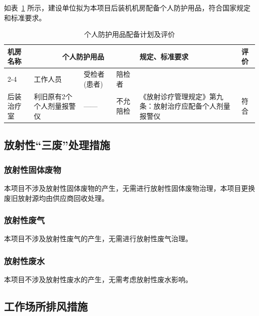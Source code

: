 如表~\ref{tab:ch4-ppe} 所示，建设单位拟为本项目后装机机房配备个人防护用品，符合国家规定和标准要求。

\begin{table}[H]
\centering
\caption{个人防护用品配备计划及评价}
\label{tab:ch4-ppe}
\begin{tabular}{|m{2cm}|m{2cm}|m{1.5cm}|m{1.5cm}|m{5cm}|m{1cm}|}
\hline
\multirow{2}{2cm}{\centering 机房名称}
& \multicolumn{3}{c|}{\centering 个人防护用品}
& \multirow{2}{5cm}{\centering 规定、标准要求}
& \multirow{2}{1cm}{\centering 评价} \\
\cline{2-4}
& \centering\arraybackslash 工作人员
& \centering\arraybackslash 受检者(患者)
& \centering\arraybackslash 陪检者
& & \\
\hline
后装治疗室
& 利旧原有2个个人剂量报警仪
& \centering\arraybackslash ——
& \centering\arraybackslash 不允陪检
& 《放射诊疗管理规定》第九条：放射治疗应配备个人剂量报警仪
& \centering\arraybackslash 符合 \\
\hline
\end{tabular}
\end{table}

\subsection{放射性“三废”处理措施}

\subsubsection{放射性固体废物}

本项目不涉及放射性固体废物的产生，无需进行放射性固体废物治理，本项目更换废旧放射源均由供应商回收处理。

\subsubsection{放射性废气}

本项目不涉及放射性废气的产生，无需进行放射性废气治理。

\subsubsection{放射性废水}

本项目不涉及放射性废水的产生，无需考虑放射性废水影响。

\subsection{工作场所排风措施}

